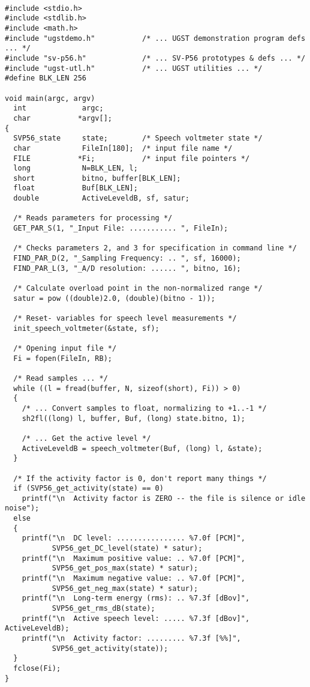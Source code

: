 {\tt\small
\begin{verbatim}
#include <stdio.h>
#include <stdlib.h>
#include <math.h>
#include "ugstdemo.h"           /* ... UGST demonstration program defs ... */
#include "sv-p56.h"             /* ... SV-P56 prototypes & defs ... */
#include "ugst-utl.h"           /* ... UGST utilities ... */
#define BLK_LEN 256

void main(argc, argv)
  int             argc;
  char           *argv[];
{
  SVP56_state     state;        /* Speech voltmeter state */
  char            FileIn[180];  /* input file name */
  FILE           *Fi;           /* input file pointers */
  long            N=BLK_LEN, l;
  short           bitno, buffer[BLK_LEN];
  float           Buf[BLK_LEN];
  double          ActiveLeveldB, sf, satur;

  /* Reads parameters for processing */
  GET_PAR_S(1, "_Input File: ........... ", FileIn);

  /* Checks parameters 2, and 3 for specification in command line */
  FIND_PAR_D(2, "_Sampling Frequency: .. ", sf, 16000);
  FIND_PAR_L(3, "_A/D resolution: ...... ", bitno, 16);

  /* Calculate overload point in the non-normalized range */
  satur = pow ((double)2.0, (double)(bitno - 1));

  /* Reset- variables for speech level measurements */
  init_speech_voltmeter(&state, sf);

  /* Opening input file */
  Fi = fopen(FileIn, RB);

  /* Read samples ... */
  while ((l = fread(buffer, N, sizeof(short), Fi)) > 0)
  {
    /* ... Convert samples to float, normalizing to +1..-1 */
    sh2fl((long) l, buffer, Buf, (long) state.bitno, 1);

    /* ... Get the active level */
    ActiveLeveldB = speech_voltmeter(Buf, (long) l, &state);
  }

  /* If the activity factor is 0, don't report many things */
  if (SVP56_get_activity(state) == 0)
    printf("\n  Activity factor is ZERO -- the file is silence or idle noise");
  else
  {
    printf("\n  DC level: ................ %7.0f [PCM]", 
           SVP56_get_DC_level(state) * satur);
    printf("\n  Maximum positive value: .. %7.0f [PCM]", 
           SVP56_get_pos_max(state) * satur);
    printf("\n  Maximum negative value: .. %7.0f [PCM]", 
           SVP56_get_neg_max(state) * satur);
    printf("\n  Long-term energy (rms): .. %7.3f [dBov]", 
           SVP56_get_rms_dB(state);
    printf("\n  Active speech level: ..... %7.3f [dBov]", ActiveLeveldB);
    printf("\n  Activity factor: ......... %7.3f [%%]",
           SVP56_get_activity(state));
  }
  fclose(Fi);
}
\end{verbatim}
}
